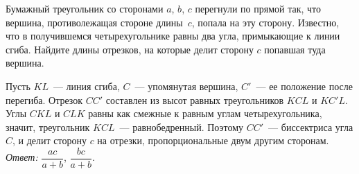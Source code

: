 Бумажный треугольник со сторонами $a$, $b$, $c$ перегнули по прямой так,
что вершина, противолежащая стороне длины~$c$, попала на эту сторону.
Известно, что в получившемся четырехугольнике равны два угла,
примыкающие к линии сгиба.
Найдите длины отрезков, на которые делит сторону $c$ попавшая туда вершина.

\solution
Пусть $KL$~--- линия сгиба, $C$~--- упомянутая вершина, $C'$~--- ее
положение после перегиба.
Отрезок $CC'$ составлен из высот равных треугольников $KCL$ и $KC'L$.
Углы $CKL$ и $CLK$ равны как смежные к равным углам четырехугольника, значит,
треугольник $KCL$~--- равнобедренный.
Поэтому $CC'$~--- биссектриса угла $C$, и делит сторону $c$ на отрезки,
пропорциональные двум другим сторонам.
\emph{Ответ:} $\dfrac{a c}{a + b}$, $\dfrac{b c}{a + b}$.

